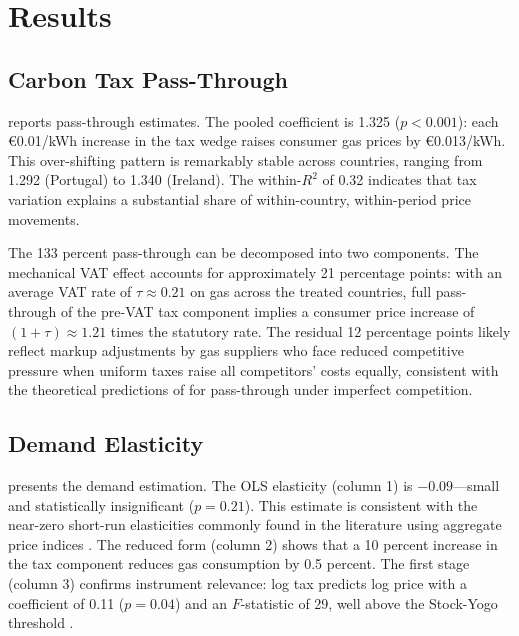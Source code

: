 \documentclass[12pt]{article}
\begin{document}
\section{Results}
\label{sec:results}

\subsection{Carbon Tax Pass-Through}

 reports pass-through estimates. The pooled coefficient is 1.325 ($p < 0.001$): each \euro{}0.01/kWh increase in the tax wedge raises consumer gas prices by \euro{}0.013/kWh. This over-shifting pattern is remarkably stable across countries, ranging from 1.292 (Portugal) to 1.340 (Ireland). The within-$R^2$ of 0.32 indicates that tax variation explains a substantial share of within-country, within-period price movements.

The 133 percent pass-through can be decomposed into two components. The mechanical VAT effect accounts for approximately 21 percentage points: with an average VAT rate of $\tau \approx 0.21$ on gas across the treated countries, full pass-through of the pre-VAT tax component implies a consumer price increase of $(1 + \tau) \approx 1.21$ times the statutory rate. The residual 12 percentage points likely reflect markup adjustments by gas suppliers who face reduced competitive pressure when uniform taxes raise all competitors' costs equally, consistent with the theoretical predictions of \citet{weyl2013pass} for pass-through under imperfect competition.



\subsection{Demand Elasticity}

 presents the demand estimation. The OLS elasticity (column 1) is $-0.09$---small and statistically insignificant ($p = 0.21$). This estimate is consistent with the near-zero short-run elasticities commonly found in the literature using aggregate price indices \citep{labandeira2017meta}. The reduced form (column 2) shows that a 10 percent increase in the tax component reduces gas consumption by 0.5 percent. The first stage (column 3) confirms instrument relevance: log tax predicts log price with a coefficient of 0.11 ($p = 0.04$) and an $F$-statistic of 29, well above the Stock-Yogo threshold \citep{stock2005testing}.
\end{document}
